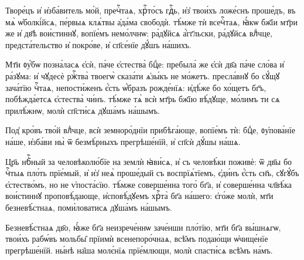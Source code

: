 \cuLettrine
Творе́цъ и҆ и҆зба́витель мо́й, пречⷭ҇таѧ, хрⷭ҇то́съ гдⷭ҇ь,  и҆з̾ твои́хъ ложе́снъ проше́дъ, въ мѧ̀ ѡ҆болкі́йсѧ, пе́рвыѧ  клѧ́твы а҆да́ма свободѝ. тѣ́мже тѝ всечⷭ҇таѧ, ꙗ҆́кѡ  бж҃їи мт҃ри же и҆ дв҃ѣ вои́стиннꙋ, вопїе́мъ немо́лчнѡ:  ра́дꙋйсѧ а҆́гг҃льски, ра́дꙋйсѧ влⷣчце, предста́тельство и҆  покро́ве, и҆ сп҃се́нїе дꙋ́шъ на́шихъ. 
%

\cuLettrine
Мт҃и ᲂу҆́бѡ позна́ласѧ є҆сѝ, па́че є҆стества̀ бцⷣе:  пребыла́ же є҆сѝ дв҃а па́че сло́ва и҆ ра́зꙋма: и҆ чꙋдесѐ  ржⷭ҇тва̀ твоегѡ̀ сказа́ти ѧ҆зы́къ не мо́жетъ. пресла́внꙋ бо  сꙋ́щꙋ зача́тїю чⷭ҇таѧ, непости́женъ є҆́сть ѡ҆́бразъ  рожде́нїѧ: и҆дѣ́же бо хо́щетъ бг҃ъ, побѣжда́етсѧ  є҆стества̀ чи́нъ. тѣ́мже тѧ̀ всѝ мт҃рь бж҃їю  вѣ́дꙋще, мо́лимъ ти сѧ прилѣ́жнѡ,  молѝ сп҃сти́сѧ дꙋша́мъ на́шымъ. 
%

\cuLettrine
Под̾ кро́въ тво́й влⷣчце, всѝ земноро́днїи прибѣга́юще,  вопїе́мъ тѝ: бцⷣе, ᲂу҆пова́нїе на́ше, и҆зба́ви ны̀ ѿ  безмѣ́рныхъ прегрѣше́нїй, и҆ сп҃сѝ дꙋ́шы на́шѧ. 
%

\cuLettrine
Цр҃ь нбⷭ҇ный за человѣколю́бїе на землѝ ꙗ҆ви́сѧ, и҆ съ  человѣ́ки поживѐ: ѿ дв҃ы бо чⷭ҇тыѧ пло́ть прїе́мый, и҆  и҆з̾ неѧ̀ проше́дый съ воспрїѧ́тїемъ, є҆ди́нъ є҆́сть  сн҃ъ, сꙋгꙋ́бъ є҆стество́мъ, но не ѵ҆поста́сїю. тѣ́мже  соверше́нна того̀ бг҃а, и҆ соверше́нна чл҃вѣ́ка вои́стиннꙋ  проповѣ́дающе, и҆сповѣ́дꙋемъ хрⷭ҇та̀ бг҃а на́шего:  є҆го́же молѝ, мт҃и безневѣ́стнаѧ, поми́ловатисѧ дꙋша́мъ  на́шымъ.  
%

\cuLettrine
Безневѣ́стнаѧ дв҃о, ꙗ҆́же бг҃а неизрече́ннѡ заче́нши  пло́тїю, мт҃и бг҃а вы́шнѧгѡ, твои́хъ рабѡ́въ мольбы̑ прїимѝ  всенепоро́чнаѧ, всѣ̑мъ подаю́щи ѡ҆чище́нїе прегрѣше́нїй.  ны́нѣ на̑ша молє́нїѧ прїе́млющи, молѝ спасти́сѧ всѣ̑мъ  на́мъ.  

